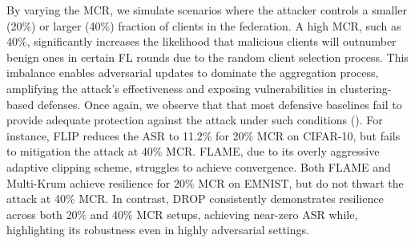 By varying the MCR, we simulate scenarios where the attacker controls a smaller (20\%) or larger (40\%) fraction of clients in the federation. A high MCR, such as 40\%, significantly increases the likelihood that malicious clients will outnumber benign ones in certain FL rounds due to the random client selection process. This imbalance enables adversarial updates to dominate the aggregation process, amplifying the attack's effectiveness and exposing vulnerabilities in clustering-based defenses. Once again, we observe that that most defensive baselines fail to provide adequate protection against the attack under such conditions (). For instance, FLIP reduces the ASR to 11.2\% for 20\% MCR on CIFAR-10, but fails to mitigation the attack at 40\% MCR.  FLAME, due to its overly aggressive adaptive clipping scheme, struggles to achieve convergence. Both FLAME and Multi-Krum achieve resilience for 20\% MCR on EMNIST, but do not thwart the attack at 40\% MCR. In contrast, DROP consistently demonstrates resilience across both 20\% and 40\% MCR setups, achieving near-zero ASR while, highlighting its robustness even in highly adversarial settings.

